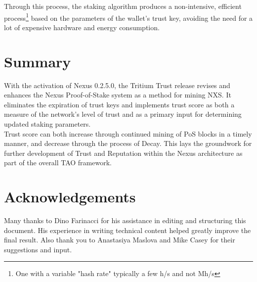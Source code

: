 \documentclass[11pt]{article}
\begin{document}
\noindent Through this process, the staking algorithm produces a non-intensive, efficient process\footnote{One with a variable "hash rate" typically a few h/s and not Mh/s} based on the parameters of the wallet’s trust key, avoiding the need for a lot of expensive hardware and energy consumption.\\

\bigskip

\section{Summary}

With the activation of Nexus 0.2.5.0, the Tritium Trust release revises and enhances the Nexus Proof-of-Stake system as a method for mining NXS. It eliminates the expiration of trust keys and implements trust score as both a measure of the network's level of trust and as a primary input for determining updated staking parameters.  \\

\noindent Trust score can both increase through continued mining of PoS blocks in a timely manner, and decrease through the process of Decay. This lays the groundwork for further development of Trust and Reputation within the Nexus architecture as part of the overall TAO framework. \\

\bigskip
\bigskip

\section*{Acknowledgements}

Many thanks to Dino Farinacci for his assistance in editing and structuring this document. His experience in writing technical content helped greatly improve the final result. Also thank you to Anastasiya Maslova and Mike Casey for their suggestions and input.
\end{document}
